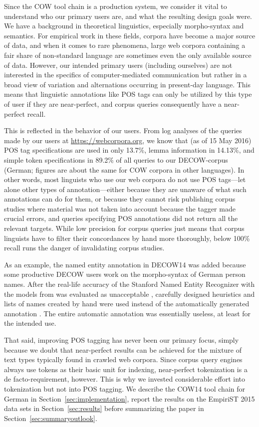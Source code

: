 \documentclass[11pt]{article}
\begin{document}
Since the COW tool chain is a production system, we consider it vital to understand who our primary users are, and what the resulting design goals were.
We have a background in theoretical linguistics, especially morpho-syntax and semantics.
For empirical work in these fields, corpora have become a major source of data, and when it comes to rare phenomena, large web corpora containing a fair share of non-standard language are sometimes even the only available source of data.
However, our intended primary users (including ourselves) are not interested in the specifics of computer-mediated communication but rather in a broad view of variation and alternations occurring in present-day language.
This means that linguistic annotations like POS tags can only be utilized by this type of user if they are near-perfect, and corpus queries consequently have a near-perfect recall.

This is reflected in the behavior of our users.
From log analyses of the queries made by our users at \url{https://webcorpora.org}, we know that (as of 15 May 2016) POS tag specifications are used in only 13.7\%, lemma information in 14.13\%, and simple token specifications in 89.2\% of all queries to our DECOW-corpus (German; figures are about the same for COW corpora in other languages).
In other words, most linguists who use our web corpora do not use POS tags---let alone other types of annotation---either because they are unaware of what such annotations can do for them, or because they cannot risk publishing corpus studies where material was not taken into account because the tagger made crucial errors, and queries specifying POS annotations did not return all the relevant targets.
While low precision for corpus queries just means that corpus linguists have to filter their concordances by hand more thoroughly, below 100\% recall runs the danger of invalidating corpus studies.

As an example, the named entity annotation in DECOW14 was added because some productive DECOW users work on the morpho-syntax of German person names.
After the real-life accuracy of the Stanford Named Entity Recognizer with the models from  was evaluated as unacceptable \cite{Helmers2013}, carefully designed heuristics and lists of names created by hand were used instead of the automatically generated annotation \cite{Ackermann2016}.
The entire automatic annotation was essentially useless, at least for the intended use.

That said, improving POS tagging has never been our primary focus, simply because we doubt that near-perfect results can be achieved for the mixture
of text types typically found in crawled web corpora.
Since corpus query engines always use tokens as their basic unit for indexing, near-perfect tokenization is a de facto-requirement, however.
This is why we invested considerable effort into tokenization but not into POS tagging.
We describe the COW14 tool chain for German in Section~\ref{sec:implementation}, report the results on the EmpiriST 2015 data sets in Section~\ref{sec:results} before summarizing the paper in Section~\ref{sec:summaryoutlook}.
\end{document}
